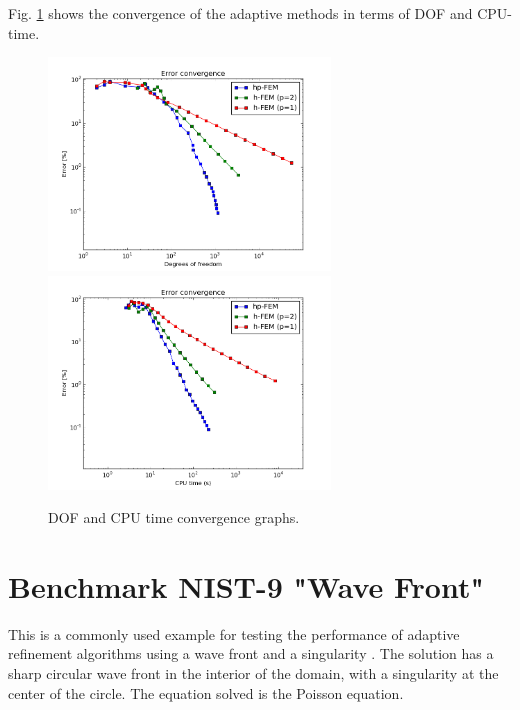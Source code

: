 \documentclass[12pt]{elsarticle}
\begin{document}
Fig. \ref{fig:nist-8-conv} shows the convergence of the adaptive methods in terms of DOF and CPU-time.

\begin{figure}[H]
\centering
\hspace{-50mm}
\includegraphics[width=7.5cm]{nist/nist-8/conv_dof_aniso.png}\ \
\hspace{-10mm}
\includegraphics[width=7.5cm]{nist/nist-8/conv_cpu_aniso.png}
\hspace{-50mm}
\caption{DOF and CPU time convergence graphs.}
\vspace{-3mm}
\label{fig:nist-8-conv}
\end{figure}


\section{Benchmark NIST-9 "Wave Front"}
\label{sec:bench-9}

This is a commonly used example for testing the performance of
adaptive refinement algorithms using a wave front and a singularity \cite{mitchell-1, mitchell-2}.
The solution has a sharp circular wave front in the interior of the
domain, with a singularity at the center of the circle.
The equation solved is the Poisson equation.
\end{document}
